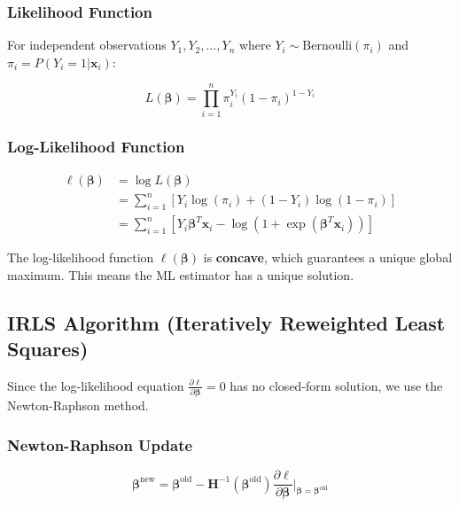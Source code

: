 \documentclass[12pt,a4paper]{article}
\begin{document}
\subsubsection{Likelihood Function}

For independent observations $Y_1, Y_2, \ldots, Y_n$ where $Y_i \sim \text{Bernoulli}(\pi_i)$ and $\pi_i = P(Y_i = 1|\mathbf{x}_i)$:

\begin{equation}
L(\boldsymbol{\beta}) = \prod_{i=1}^n \pi_i^{Y_i}(1-\pi_i)^{1-Y_i}
\end{equation}

\subsubsection{Log-Likelihood Function}

\begin{align}
\ell(\boldsymbol{\beta}) &= \log L(\boldsymbol{\beta}) \\
&= \sum_{i=1}^n \left[ Y_i \log(\pi_i) + (1 - Y_i) \log(1 - \pi_i) \right] \\
&= \sum_{i=1}^n \left[ Y_i \boldsymbol{\beta}^T\mathbf{x}_i - \log(1 + \exp(\boldsymbol{\beta}^T\mathbf{x}_i)) \right]
\end{align}

\begin{tcolorbox}[colback=red!5!white,colframe=red!75!black,title=Important Property]
The log-likelihood function $\ell(\boldsymbol{\beta})$ is \textbf{concave}, which guarantees a unique global maximum. This means the ML estimator has a unique solution.
\end{tcolorbox}

\subsection{IRLS Algorithm (Iteratively Reweighted Least Squares)}

Since the log-likelihood equation $\frac{\partial \ell}{\partial \boldsymbol{\beta}} = 0$ has no closed-form solution, we use the Newton-Raphson method.

\subsubsection{Newton-Raphson Update}

\begin{equation}
\boldsymbol{\beta}^{\text{new}} = \boldsymbol{\beta}^{\text{old}} - \mathbf{H}^{-1}(\boldsymbol{\beta}^{\text{old}}) \frac{\partial \ell}{\partial \boldsymbol{\beta}}\bigg|_{\boldsymbol{\beta}=\boldsymbol{\beta}^{\text{old}}}
\end{equation}
\end{document}
